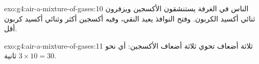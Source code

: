 \begin{solution}{exo:g4:air-a-mixture-of-gases:10}
الناس في الغرفة يستنشقون الأكسجين ويزفرون ثنائي أكسيد الكربون. وفتح
النوافذ يعيد  النقي، وفيه أكسجين أكثر وثنائي أكسيد كربون
أقل.
\end{solution}

\begin{solution}{exo:g4:air-a-mixture-of-gases:11}
ثلاثة أضعاف  تحوي ثلاثة أضعاف الأكسجين: أي نحو
$3 \times 10 = 30$ ثانية.
\end{solution}
